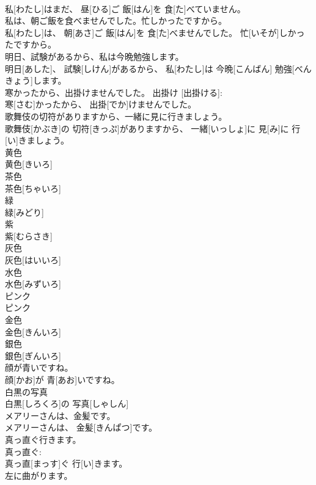 \documentclass[8pt]{extreport}
\begin{document}
\begin{CJK}{UTF8}{min}
\\	私[わたし]はまだ、 昼[ひる]ご 飯[はん]を 食[た]べていません。	
\\	私は、朝ご飯を食べませんでした。忙しかったですから。	
\\	私[わたし]は、 朝[あさ]ご 飯[はん]を 食[た]べませんでした。 忙[いそが]しかったですから。	
\\	明日、試験があるから、私は今晩勉強します。	
\\	明日[あした]、 試験[しけん]があるから、 私[わたし]は 今晩[こんばん] 勉強[べんきょう]します。	
\\	寒かったから、出掛けませんでした。	出掛け [出掛ける]: 
\\	寒[さむ]かったから、 出掛[でか]けませんでした。	
\\	歌舞伎の切符がありますから、一緒に見に行きましょう。	
\\	歌舞伎[かぶき]の 切符[きっぷ]がありますから、 一緒[いっしょ]に 見[み]に 行[い]きましょう。	
\\	黄色	
\\	黄色[きいろ]		
\\	茶色	
\\	茶色[ちゃいろ]		
\\	緑	
\\	緑[みどり]		
\\	紫	
\\	紫[むらさき]		
\\	灰色	
\\	灰色[はいいろ]		
\\	水色	
\\	水色[みずいろ]		
\\	ピンク	
\\	ピンク		
\\	金色	
\\	金色[きんいろ]		
\\	銀色	
\\	銀色[ぎんいろ]		
\\	顔が青いですね。	
\\	顔[かお]が 青[あお]いですね。		
\\	白黒の写真	
\\	白黒[しろくろ]の 写真[しゃしん]		
\\	メアリーさんは、金髪です。	
\\	メアリーさんは、 金髪[きんぱつ]です。		
\\	真っ直ぐ行きます。	
\\	真っ直ぐ: 
\\	真っ直[まっす]ぐ 行[い]きます。		
\\	左に曲がります。	

\end{CJK}
\end{document}
